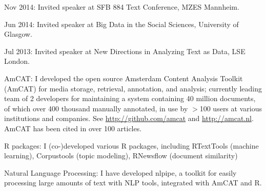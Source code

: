 \documentclass[a4paper,11pt]{article}
\begin{document}
{{\item Nov 2014: Invited speaker at SFB 884 Text Conference, MZES Mannheim.
\item Jun 2014: Invited speaker at Big Data in the Social Sciences, University of Glasgow. 
\item Jul 2013: Invited speaker at New Directions in Analyzing Text as Data, LSE London.
}
\newpage
{}

{\item AmCAT: I developed the open source Amsterdam Content Analysis Toolkit (AmCAT) 
for media storage, retrieval, annotation, and analysis; currently leading team of
2 developers for maintaining a system containing 40 million documents,
of which over 400 thousand manually annotated, in use by $>$100 users
at various institutions and companies. See
\url{http://github.com/amcat} and \url{http://amcat.nl}.
AmCAT has been cited in over 100 articles.
\item R packages: I (co-)developed various R packages, including RTextTools (machine learning), Corpustools (topic modeling), RNewsflow (document similarity)
\item Natural Language Processing: I have developed nlpipe, a toolkit for easily processing large amounts of text with NLP tools, integrated with AmCAT and R.  
}


}
\end{document}
